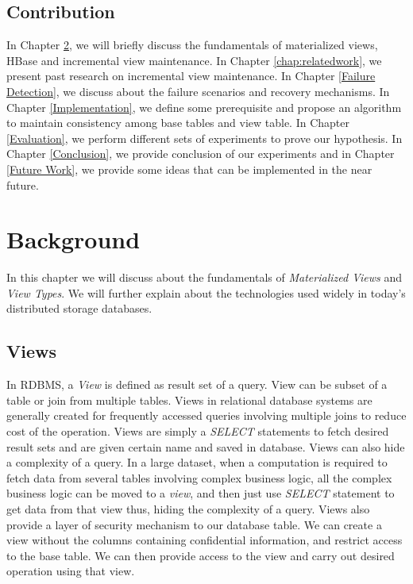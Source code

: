 \documentclass[11pt,a4paper,bibtotoc,idxtotoc,headsepline,footsepline,footexclude,BCOR12mm,DIV13]{scrbook}
\begin{document}
\section{Contribution}
In Chapter \ref{chap:background}, we will briefly discuss the fundamentals of materialized views, HBase and incremental view maintenance. In Chapter \ref{chap:relatedwork}, we present past research on incremental view maintenance. In Chapter \ref{Failure Detection}, we discuss about the failure scenarios and recovery mechanisms. In Chapter \ref{Implementation}, we define some prerequisite and propose an algorithm to maintain consistency among base tables and view table. In Chapter \ref{Evaluation}, we perform different sets of experiments to prove our hypothesis. In Chapter \ref{Conclusion}, we provide conclusion of our experiments and in Chapter \ref{Future Work}, we provide some ideas that can be implemented in the near future.


\chapter{Background}
\label{chap:background}

In this chapter we will discuss about the fundamentals of \emph{Materialized Views} and \emph{View Types}. We will further explain about the technologies used widely in today's distributed storage databases. 

\section{Views}
In RDBMS, a \emph{View} is defined as result set of a query. View can be subset of a table or join from multiple tables. Views in relational database systems are generally created for frequently accessed queries involving multiple joins to reduce cost of the operation. Views are simply a \emph{SELECT} statements to fetch desired result sets and are given certain name and saved in database. Views can also hide a complexity of a query. In a large dataset, when a computation is required to fetch data from several tables involving complex business logic, all the complex business logic can be moved to a \emph{view}, and then just use \emph{SELECT} statement to get data from that view thus, hiding the complexity of a query. Views also provide a layer of security mechanism to our database table. We can create a view without the columns containing confidential information, and restrict access to the base table. We can then provide access to the view and carry out desired operation using that view. 
\end{document}
